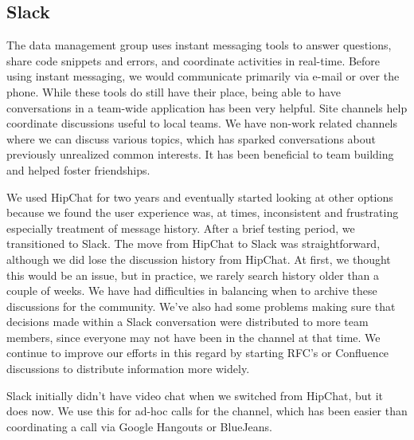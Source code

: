 \subsection{Slack}
\label{sec:slack}

The data management group uses instant messaging tools  to answer questions,
share code snippets and errors, and coordinate activities in real-time.
Before using instant messaging, we would communicate primarily via e-mail or
over the phone. While these tools do still have their place, being able to have
conversations in a team-wide application has been very helpful.
Site channels help coordinate discussions
useful to local teams.  We have non-work related channels where we can
discuss various topics, which has sparked conversations about previously
unrealized common interests. It has been beneficial to team building and
helped foster friendships.


We used HipChat for two years and eventually started looking at other options
because we found the user experience was, at times, inconsistent and
frustrating especially treatment of message history.
After a brief testing period, we transitioned to Slack.
The move from HipChat to Slack was straightforward,
although we did lose the discussion history from HipChat.  At first, we
thought this would be an issue, but in practice, we rarely search history older
than a couple of weeks.  We have had difficulties in balancing when to
archive these discussions for the community.  We've also had some problems
making sure that decisions made within a Slack conversation were
distributed to more team members, since everyone may not have been in the
channel at that time.  We continue to improve our efforts in this regard by
starting RFC's or Confluence discussions to distribute information more widely.

\noindent Slack initially didn't have video chat when we switched from HipChat, but
it does now.  We use this for ad-hoc calls for the channel, which has been
easier than coordinating a call via Google Hangouts or BlueJeans.

